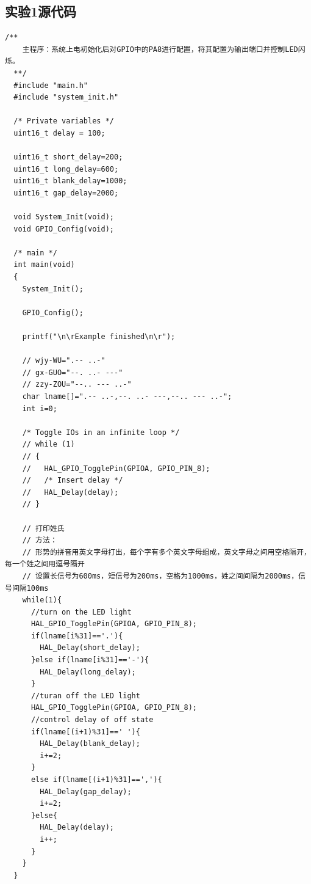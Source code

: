 ﻿\documentclass[UTF8,12pt]{article}
\begin{document}
\subsection{实验1源代码}
\begin{lstlisting}[frame=shadowbox]
    /**
    主程序：系统上电初始化后对GPIO中的PA8进行配置，将其配置为输出端口并控制LED闪烁。
  **/
  #include "main.h"
  #include "system_init.h"
  
  /* Private variables */
  uint16_t delay = 100;
  
  uint16_t short_delay=200;
  uint16_t long_delay=600;
  uint16_t blank_delay=1000;
  uint16_t gap_delay=2000;
  
  void System_Init(void);
  void GPIO_Config(void);
  
  /* main */
  int main(void)
  {
    System_Init();
    
    GPIO_Config();
    
    printf("\n\rExample finished\n\r");
  
    // wjy-WU=".-- ..-"
    // gx-GUO="--. ..- ---"
    // zzy-ZOU="--.. --- ..-"
    char lname[]=".-- ..-,--. ..- ---,--.. --- ..-";
    int i=0;
  
    /* Toggle IOs in an infinite loop */
    // while (1)
    // {
    //   HAL_GPIO_TogglePin(GPIOA, GPIO_PIN_8);
    //   /* Insert delay */
    //   HAL_Delay(delay);
    // }
  
    // 打印姓氏
    // 方法：
    // 形势的拼音用英文字母打出，每个字有多个英文字母组成，英文字母之间用空格隔开，每一个姓之间用逗号隔开
    // 设置长信号为600ms，短信号为200ms，空格为1000ms，姓之间间隔为2000ms，信号间隔100ms
    while(1){
      //turn on the LED light
      HAL_GPIO_TogglePin(GPIOA, GPIO_PIN_8);
      if(lname[i%31]=='.'){
        HAL_Delay(short_delay);
      }else if(lname[i%31]=='-'){
        HAL_Delay(long_delay);
      }
      //turan off the LED light
      HAL_GPIO_TogglePin(GPIOA, GPIO_PIN_8);
      //control delay of off state
      if(lname[(i+1)%31]==' '){
        HAL_Delay(blank_delay);
        i+=2;
      }
      else if(lname[(i+1)%31]==','){
        HAL_Delay(gap_delay);
        i+=2;
      }else{
        HAL_Delay(delay);
        i++;
      }
    }
  }  
\end{lstlisting}
\end{document}
